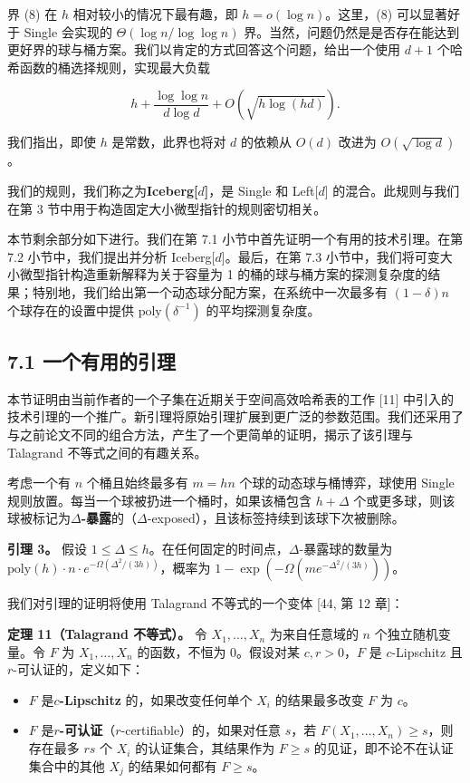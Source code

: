 \documentclass[12pt,a4paper]{ctexart}
\theoremstyle{remark}
\begin{document}
界 (8) 在 $h$ 相对较小的情况下最有趣，即 $h=o(\log n)$。这里，(8) 可以显著好于 Single 会实现的 $\Theta(\log n/\log\log n)$ 界。当然，问题仍然是是否存在能达到更好界的球与桶方案。我们以肯定的方式回答这个问题，给出一个使用 $d+1$ 个哈希函数的桶选择规则，实现最大负载

$$h+\frac{\log\log n}{d\log d}+O\left(\sqrt{h\log(hd)}\right).\tag{9}$$

我们指出，即使 $h$ 是常数，此界也将对 $d$ 的依赖从 $O(d)$ 改进为 $O(\sqrt{\log d})$。

我们的规则，我们称之为\textbf{Iceberg[$d$]}，是 Single 和 Left[$d$] 的混合。此规则与我们在第 3 节中用于构造固定大小微型指针的规则密切相关。

本节剩余部分如下进行。我们在第 7.1 小节中首先证明一个有用的技术引理。在第 7.2 小节中，我们提出并分析 Iceberg[$d$]。最后，在第 7.3 小节中，我们将可变大小微型指针构造重新解释为关于容量为 1 的桶的球与桶方案的探测复杂度的结果；特别地，我们给出第一个动态球分配方案，在系统中一次最多有 $(1-\delta)n$ 个球存在的设置中提供 $\text{poly}(\delta^{-1})$ 的平均探测复杂度。

\subsection{7.1 一个有用的引理}
本节证明由当前作者的一个子集在近期关于空间高效哈希表的工作 [11] 中引入的技术引理的一个推广。新引理将原始引理扩展到更广泛的参数范围。我们还采用了与之前论文不同的组合方法，产生了一个更简单的证明，揭示了该引理与 Talagrand 不等式之间的有趣关系。

考虑一个有 $n$ 个桶且始终最多有 $m=hn$ 个球的动态球与桶博弈，球使用 Single 规则放置。每当一个球被扔进一个桶时，如果该桶包含 $h+\Delta$ 个或更多球，则该球被标记为\textbf{$\Delta$-暴露}的（$\Delta$-exposed），且该标签持续到该球下次被删除。

\textbf{引理 3。} 假设 $1\leq\Delta\leq h$。在任何固定的时间点，$\Delta$-暴露球的数量为 $\text{poly}(h)\cdot n\cdot e^{-\Omega(\Delta^2/(3h))}$，概率为 $1-\exp(-\Omega(me^{-\Delta^2/(3h)}))$。

我们对引理的证明将使用 Talagrand 不等式的一个变体 [44, 第 12 章]：

\textbf{定理 11（Talagrand 不等式）。} 令 $X_1,\ldots,X_n$ 为来自任意域的 $n$ 个独立随机变量。令 $F$ 为 $X_1,\ldots,X_n$ 的函数，不恒为 0。假设对某 $c,r>0$，$F$ 是 $c$-Lipschitz 且 $r$-可认证的，定义如下：

\begin{itemize}
\item $F$ 是\textbf{$c$-Lipschitz} 的，如果改变任何单个 $X_i$ 的结果最多改变 $F$ 为 $c$。
\item $F$ 是\textbf{$r$-可认证}（$r$-certifiable）的，如果对任意 $s$，若 $F(X_1,\ldots,X_n)\geq s$，则存在最多 $rs$ 个 $X_i$ 的认证集合，其结果作为 $F\geq s$ 的见证，即不论不在认证集合中的其他 $X_j$ 的结果如何都有 $F\geq s$。
\end{itemize}
\end{document}
